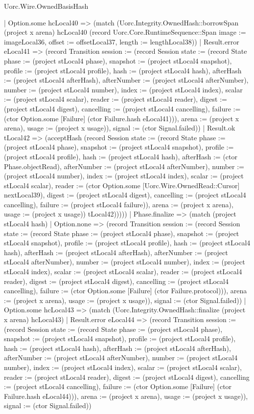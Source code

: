 \begin{lexlean}{Uorc.Wire.OwnedBasisHash}
\begin{semanticmodule}
{            | Option.some hcLocal40 => (match (Uorc.Integrity.OwnedHash::borrowSpan (project x arena) hcLocal40 (record Uorc.Core.RuntimeSequence::Span {image := imageLocal36, offset := offsetLocal37, length := lengthLocal38}))
              | Result.error eLocal41 => (record Transition {session := (record Session {state := (record State {phase := (project stLocal4 phase), snapshot := (project stLocal4 snapshot), profile := (project stLocal4 profile), hash := (project stLocal4 hash), afterHash := (project stLocal4 afterHash), afterNumber := (project stLocal4 afterNumber), number := (project stLocal4 number), index := (project stLocal4 index), scalar := (project stLocal4 scalar), reader := (project stLocal4 reader), digest := (project stLocal4 digest), cancelling := (project stLocal4 cancelling), failure := (ctor Option.some [Failure] (ctor Failure.hash eLocal41))}), arena := (project x arena), usage := (project x usage)}), signal := (ctor Signal.failed)})
              | Result.ok tLocal42 => (acceptHash (record Session {state := (record State {phase := (project stLocal4 phase), snapshot := (project stLocal4 snapshot), profile := (project stLocal4 profile), hash := (project stLocal4 hash), afterHash := (ctor Phase.objectRead), afterNumber := (project stLocal4 afterNumber), number := (project stLocal4 number), index := (project stLocal4 index), scalar := (project stLocal4 scalar), reader := (ctor Option.some [Uorc.Wire.OwnedRead::Cursor] nextLocal39), digest := (project stLocal4 digest), cancelling := (project stLocal4 cancelling), failure := (project stLocal4 failure)}), arena := (project x arena), usage := (project x usage)}) tLocal42)))))
      | Phase.finalize => (match (project stLocal4 hash)
        | Option.none => (record Transition {session := (record Session {state := (record State {phase := (project stLocal4 phase), snapshot := (project stLocal4 snapshot), profile := (project stLocal4 profile), hash := (project stLocal4 hash), afterHash := (project stLocal4 afterHash), afterNumber := (project stLocal4 afterNumber), number := (project stLocal4 number), index := (project stLocal4 index), scalar := (project stLocal4 scalar), reader := (project stLocal4 reader), digest := (project stLocal4 digest), cancelling := (project stLocal4 cancelling), failure := (ctor Option.some [Failure] (ctor Failure.protocol))}), arena := (project x arena), usage := (project x usage)}), signal := (ctor Signal.failed)})
        | Option.some hcLocal43 => (match (Uorc.Integrity.OwnedHash::finalize (project x arena) hcLocal43)
          | Result.error eLocal44 => (record Transition {session := (record Session {state := (record State {phase := (project stLocal4 phase), snapshot := (project stLocal4 snapshot), profile := (project stLocal4 profile), hash := (project stLocal4 hash), afterHash := (project stLocal4 afterHash), afterNumber := (project stLocal4 afterNumber), number := (project stLocal4 number), index := (project stLocal4 index), scalar := (project stLocal4 scalar), reader := (project stLocal4 reader), digest := (project stLocal4 digest), cancelling := (project stLocal4 cancelling), failure := (ctor Option.some [Failure] (ctor Failure.hash eLocal44))}), arena := (project x arena), usage := (project x usage)}), signal := (ctor Signal.failed)})
}
\end{semanticmodule}
\end{lexlean}
